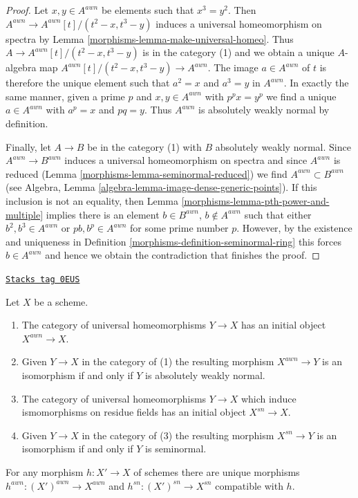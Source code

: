 \begin{proof}
\medskip\noindent
Let $x, y \in A^{awn}$ be elements such that $x^3 = y^2$.
Then $A^{awn} \to A^{awn}[t]/(t^2 - x, t^3 - y)$ induces
a universal homeomorphism on spectra by Lemma \ref{morphisms-lemma-make-universal-homeo}.
Thus $A \to A^{awn}[t]/(t^2 - x, t^3 - y)$ is in the category (1)
and we obtain a unique $A$-algebra map
$A^{awn}[t]/(t^2 - x, t^3 - y) \to A^{awn}$.
The image $a \in A^{awn}$ of $t$ is therefore the unique
element such that $a^2 = x$ and $a^3 = y$ in $A^{awn}$.
In exactly the same manner, given a prime $p$ and $x, y \in A^{awn}$
with $p^px = y^p$ we find a unique $a \in A^{awn}$ with
$a^p = x$ and $pq = y$. Thus $A^{awn}$ is absolutely weakly normal
by definition.

\medskip\noindent
Finally, let $A \to B$ be in the category (1) with $B$ absolutely weakly normal.
Since $A^{awn} \to B^{awn}$ induces a universal homeomorphism on spectra and
since $A^{awn}$ is reduced (Lemma \ref{morphisms-lemma-seminormal-reduced}) we find
$A^{awn} \subset B^{awn}$
(see Algebra, Lemma \ref{algebra-lemma-image-dense-generic-points}).
If this inclusion is not an equality, then
Lemma \ref{morphisms-lemma-pth-power-and-multiple}
implies there is an element $b \in B^{awn}$, $b \not \in A^{awn}$
such that either $b^2, b^3 \in A^{awn}$ or $pb, b^p \in A^{awn}$
for some prime number $p$. However, by the existence and uniqueness in
Definition \ref{morphisms-definition-seminormal-ring} this forces $b \in A^{awn}$
and hence we obtain the contradiction that finishes the proof.
\end{proof}

\begin{lemma}[Seminormalization]
\label{morphisms-lemma-seminormalization}
\href{https://stacks.math.columbia.edu/tag/0EUS}{\texttt{Stacks tag 0EUS}}

Let $X$ be a scheme.
\begin{enumerate}
\item The category of universal homeomorphisms $Y \to X$ has
an initial object $X^{awn} \to X$.
\item Given $Y \to X$ in the category of (1) the resulting morphism
$X^{awn} \to Y$ is an isomorphism if and only if $Y$ is
absolutely weakly normal.
\item The category of universal homeomorphisms $Y \to X$ which
induce ismomorphisms on residue fields has an initial object
$X^{sn} \to X$.
\item Given $Y \to X$ in the category of (3) the resulting morphism
$X^{sn} \to Y$ is an isomorphism if and only if $Y$ is seminormal.
\end{enumerate}
For any morphism $h : X' \to X$ of schemes there are unique morphisms
$h^{awn} : (X')^{awn} \to X^{awn}$ and $h^{sn} : (X')^{sn} \to X^{sn}$
compatible with $h$.
\end{lemma}

